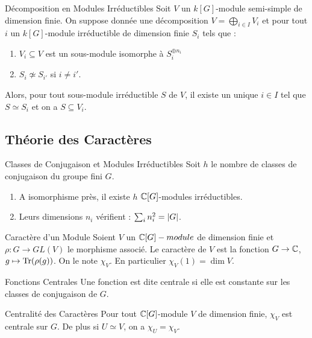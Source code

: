 \documentclass{cours}
\begin{document}
\begin{propositionfr}{Décomposition en Modules Irréductibles}{}
    Soit $V$ un $k[G]$-module semi-simple de dimension finie. On suppose donnée une décomposition $V = \bigoplus_{i \in I} V_{i}$ et pour tout $i$ un $k[G]$-module irréductible de dimension finie $S_{i}$ tels que :
    \begin{enumerate}
        \item $V_{i} \subseteq V$ est un sous-module isomorphe à $S_{i}^{\oplus n_{i}}$
        \item $S_{i} \not \simeq S_{i'}$ si $i \neq i'$.
    \end{enumerate}
    Alors, pour tout sous-module irréductible $S$ de $V$, il existe un unique $i \in I$ tel que $S \simeq S_{i}$ et on a $S \subseteq V_{i}$.
\end{propositionfr}

\subsection{Théorie des Caractères}
\begin{théorème}{Classes de Conjugaison et Modules Irréductibles}{}
    Soit $h$ le nombre de classes de conjugaison du groupe fini $G$.
    \begin{enumerate}
        \item A isomorphisme près, il existe $h$ $\mathbb{C}[G]$-modules irréductibles.
        \item Leurs dimensions $n_{i}$ vérifient : $\sum_{i} n_{i}^{2} = \left|G\right|$.
    \end{enumerate}
\end{théorème}

\begin{définition}{Caractère d'un Module}{}
    Soient $V$ un $\mathbb{C}[G]-module$ de dimension finie et $\rho : G \rightarrow GL(V)$ le morphisme associé. Le caractère de $V$ est la fonction $G \to \mathbb{C}$, $g \mapsto \operatorname{Tr}(\rho(g))$. On le note $\chi_{V}$. En particulier $\chi_{V}(1) = \dim V$.
\end{définition}

\begin{définition}{Fonctions Centrales}{}
    Une fonction est dite centrale si elle est constante sur les classes de conjugaison de $G$.
\end{définition}

\begin{propositionfr}{Centralité des Caractères}{}
    Pour tout $\mathbb{C}[G]$-module $V$ de dimension finie, $\chi_{V}$ est centrale sur $G$. De plus si $U \simeq V$, on a $\chi_{U} = \chi_{V}$.
\end{propositionfr}
\end{document}
